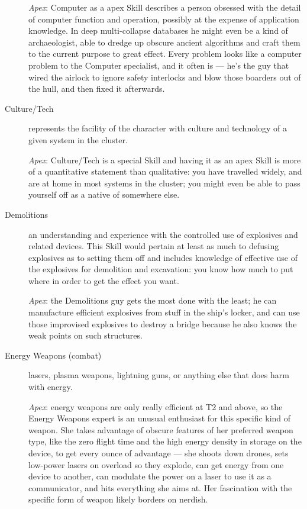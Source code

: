 \begin{description}
\emph{Apex}: Computer as a apex Skill describes a person obsessed with the detail of computer function and operation, possibly at the expense of application knowledge. In deep multi-collapse databases he might even be a kind of archaeologist, able to dredge up obscure ancient algorithms and craft them to the current purpose to great effect. Every problem looks like a computer problem to the Computer specialist, and it often is --- he's the guy that wired the airlock to ignore safety interlocks and blow those boarders out of the hull, and then fixed it afterwards.

\item[Culture/Tech]
represents the facility of the character with culture and technology of a given system in the cluster.

\emph{Apex}: Culture/Tech is a special Skill and having it as an apex Skill is more of a quantitative statement than qualitative: you have travelled widely, and are at home in most systems in the cluster; you might even be able to pass yourself off as a native of somewhere else.

\item[Demolitions]
an understanding and experience with the controlled use of explosives and related devices. This Skill would pertain at least as much to defusing explosives as to setting them off and includes knowledge of effective use of the explosives for demolition and excavation: you know how much to put where in order to get the effect you want.

\emph{Apex}: the Demolitions guy gets the most done with the least; he can manufacture efficient explosives from stuff in the ship's locker, and can use those improvised explosives to destroy a bridge because he also knows the weak points on such structures.

\item[Energy Weapons (combat)]
lasers, plasma weapons, lightning guns, or anything else that does harm with energy.

\emph{Apex}: energy weapons are only really efficient at T2 and above, so the Energy Weapons expert is an unusual enthusiast for this specific kind of weapon. She takes advantage of obscure features of her preferred weapon type, like the zero flight time and the high energy density in storage on the device, to get every ounce of advantage --- she shoots down drones, sets low-power lasers on overload so they explode, can get energy from one device to another, can modulate the power on a laser to use it as a communicator, and hits everything she aims at. Her fascination with the specific form of weapon likely borders on nerdish.


\end{description}
